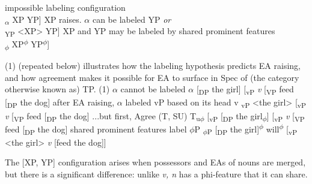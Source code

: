 \documentclass[output=paper
,modfonts
,nonflat]{langsci/langscibook}
\begin{document}
{\begin{exe}
	\ex \xlist
	\ex impossible labeling configuration\\
	{\lbrack}\textsubscript{$\alpha$} XP YP] 
	\ex XP raises. ${\alpha}$ can be labeled YP  \textit{or}\\
	{\lbrack}\textsubscript{YP} <XP> YP] 
	\ex XP and YP may be labeled by shared prominent features\\
	{\lbrack}\textsubscript{$\phi$} XP\textsuperscript{$\phi$} YP\textsuperscript{$\phi$}] 
	\endxlist
\end{exe}
(1) (repeated below) illustrates how the labeling hypothesis predicts EA raising, and how agreement makes it possible for EA to surface in Spec of (the category otherwise known as) TP.
\newline
(1)
		\ex $\alpha$ cannot be labeled\newline
		{\lbrack}$\alpha$ [\textsubscript{DP} the girl] [\textsubscript{vP} \textit{v} [\textsubscript{VP} feed [\textsubscript{DP} the dog]{\rbrack} 
		\ex after EA raising, $\alpha$ labeled vP based on its head v\newline
		{\lbrack}\textsubscript{vP} {\textless}the girl{\textgreater} [\textsubscript{vP} \textit{v} [\textsubscript{VP} feed [\textsubscript{DP} the dog]{\rbrack} 
		\ex ...but first, Agree (T, SU)\newline
		{\lbrack}T\textsubscript{u$\phi$} [\textsubscript{vP} [\textsubscript{DP} the girl\textsubscript{$\phi$}] [\textsubscript{vP} \textit{v} [\textsubscript{VP} feed [\textsubscript{DP} the dog]{\rbrack} 
		\ex shared prominent features label $\phi$P\newline
		{\lbrack}\textsubscript{$\phi$P} [\textsubscript{DP} the girl]\textsuperscript{$\phi$} will\textsuperscript{$\phi$} [\textsubscript{vP} <the girl> \textit{v} [feed the dog]]{\rbrack}  
	
\newline\noindent %
The [XP, YP] configuration arises when possessors and EAs of nouns are merged, but there is a significant difference: unlike \textit{v, n} has a phi-feature that it can share. 

}
\end{document}
